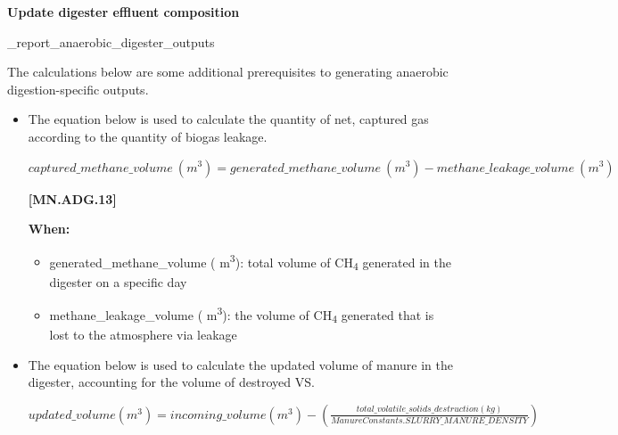 \begin{refsection}
\begin{itemize}
    \end{itemize}
    \vspace{0.2cm}

\textbf{Update digester effluent composition}
\vspace{ 0.25cm}
    
\_report\_anaerobic\_digester\_outputs
\vspace{0.2cm}

The calculations below are some additional prerequisites to generating anaerobic digestion-specific outputs.

    \begin{itemize}
        \item The equation below is used to calculate the quantity of net, captured gas according to the quantity of biogas leakage. 
            \vspace{0.5cm}

        \begin{center}
            \(captured\_methane\_volume\ (m^3)  = generated\_methane\_volume\ (m^3)  - methane\_leakage\_volume\ (m^3)\)
        \end{center}
        \vspace{0.5cm} 
    
            {\raggedleft \textbf{[MN.ADG.13]}\par}
            \vspace{0.2cm}
            
        \textbf{When:}
        
        \begin{itemize}
            \item generated\_methane\_volume ( m\textsuperscript{3}): total volume of CH\textsubscript{4} generated in the digester on a specific day
            \item methane\_leakage\_volume ( m\textsuperscript{3}): the volume of CH\textsubscript{4} generated that is lost to the atmosphere via leakage
        \end{itemize}
        \vspace{0.2cm}
        
        \item The equation below is used to calculate the updated volume of manure in the digester, accounting for the volume of destroyed VS.
            \vspace{0.5cm}

        \begin{center}
            \(updated\_volume (m^3) = incoming\_volume (m^3) - (\frac{total\_volatile\_solids\_destruction (kg)}{ ManureConstants.SLURRY\_MANURE\_DENSITY})\)
        \end{center}
        \vspace{0.5cm} 
    

\end{itemize}
\end{refsection}

